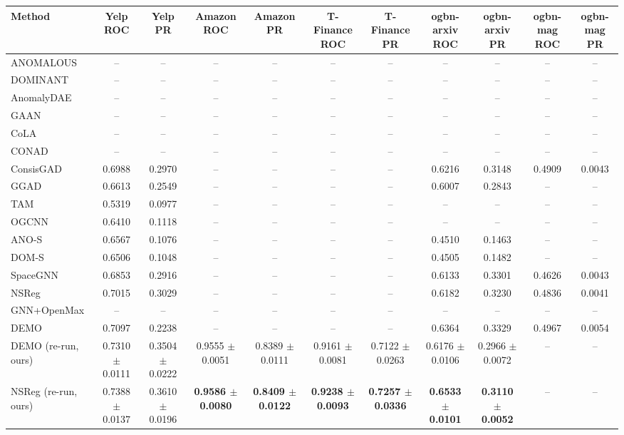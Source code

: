 \begin{table}[t]
\centering
\small
\begin{tabular}{lcccccccccc}
\toprule
Method & Yelp ROC & Yelp PR & Amazon ROC & Amazon PR & T-Finance ROC & T-Finance PR & ogbn-arxiv ROC & ogbn-arxiv PR & ogbn-mag ROC & ogbn-mag PR \\
\midrule
ANOMALOUS & -- & -- & -- & -- & -- & -- & -- & -- & -- & -- \\
DOMINANT & -- & -- & -- & -- & -- & -- & -- & -- & -- & -- \\
AnomalyDAE & -- & -- & -- & -- & -- & -- & -- & -- & -- & -- \\
GAAN & -- & -- & -- & -- & -- & -- & -- & -- & -- & -- \\
CoLA & -- & -- & -- & -- & -- & -- & -- & -- & -- & -- \\
CONAD & -- & -- & -- & -- & -- & -- & -- & -- & -- & -- \\
ConsisGAD & 0.6988 & 0.2970 & -- & -- & -- & -- & 0.6216 & 0.3148 & 0.4909 & 0.0043 \\
GGAD & 0.6613 & 0.2549 & -- & -- & -- & -- & 0.6007 & 0.2843 & -- & -- \\
TAM & 0.5319 & 0.0977 & -- & -- & -- & -- & -- & -- & -- & -- \\
OGCNN & 0.6410 & 0.1118 & -- & -- & -- & -- & -- & -- & -- & -- \\
ANO-S & 0.6567 & 0.1076 & -- & -- & -- & -- & 0.4510 & 0.1463 & -- & -- \\
DOM-S & 0.6506 & 0.1048 & -- & -- & -- & -- & 0.4505 & 0.1482 & -- & -- \\
SpaceGNN & 0.6853 & 0.2916 & -- & -- & -- & -- & 0.6133 & 0.3301 & 0.4626 & 0.0043 \\
NSReg & 0.7015 & 0.3029 & -- & -- & -- & -- & 0.6182 & 0.3230 & 0.4836 & 0.0041 \\
GNN+OpenMax & -- & -- & -- & -- & -- & -- & -- & -- & -- & -- \\
DEMO & 0.7097 & 0.2238 & -- & -- & -- & -- & 0.6364 & 0.3329 & 0.4967 & 0.0054 \\
DEMO (re-run, ours) & 0.7310 $\pm$ 0.0111 & 0.3504 $\pm$ 0.0222 & 0.9555 $\pm$ 0.0051 & 0.8389 $\pm$ 0.0111 & 0.9161 $\pm$ 0.0081 & 0.7122 $\pm$ 0.0263 & 0.6176 $\pm$ 0.0106 & 0.2966 $\pm$ 0.0072 & -- & -- \\
NSReg (re-run, ours) & 0.7388 $\pm$ 0.0137 & 0.3610 $\pm$ 0.0196 & \textbf{0.9586 $\pm$ 0.0080} & \textbf{0.8409 $\pm$ 0.0122} & \textbf{0.9238 $\pm$ 0.0093} & \textbf{0.7257 $\pm$ 0.0336} & \textbf{0.6533 $\pm$ 0.0101} & \textbf{0.3110 $\pm$ 0.0052} & -- & -- \\

\end{tabular}
\end{table}
